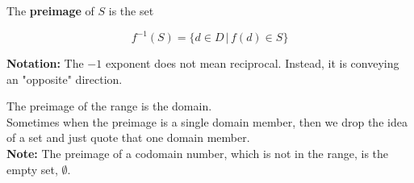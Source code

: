 \documentclass{ximera}
\begin{document}
The \textbf{preimage} of $S$ is the set

\[  f^{-1}(S) = \{ d \in D \, | \, f(d) \in S  \}    \]

\textbf{Notation:}  The $-1$ exponent does not mean reciprocal.  Instead, it is conveying an "opposite" direction.


The preimage of the range is the domain. \\

Sometimes when the preimage is a single domain member, then we drop the idea of a set and just quote that one domain member. \\


\textbf{Note:} The preimage of a codomain number, which is not in the range, is the empty set, $\emptyset$. \\
\end{document}
